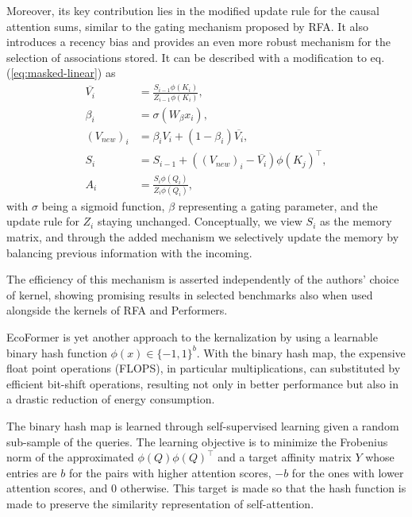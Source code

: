 Moreover, its key contribution lies in the modified update rule for the causal attention sums, similar to the gating mechanism proposed by RFA. It also introduces a recency bias and provides an even more robust mechanism for the selection of associations stored. It can be described with a modification to eq. (\ref{eq:masked-linear}) as
\begin{align*}
	\overline{V_i} &= \frac{S_{i-1} \phi(K_i)}{Z_{i-1} \phi(K_i)},  \\
	\beta_i &= \sigma(W_\beta x_i), \\
	(V_{new})_i &= \beta_i V_i + (1 - \beta_i) \overline{V_i}, \\
	S_i &= S_{i-1} + ((V_{new})_i - \overline{V_i})\phi(K_j)^\top, \\
	A_i &= \frac{S_i \phi(Q_i)}{Z_i \phi(Q_i)}, 
\end{align*}
with $\sigma$ being a sigmoid function, $\beta$ representing a gating parameter, and the update rule for $Z_i$ staying unchanged. Conceptually, we view $S_i$ as the memory matrix, and through the added mechanism we selectively update the memory by balancing previous information with the incoming. 

The efficiency of this mechanism is asserted independently of the authors' choice of kernel, showing promising results in selected benchmarks also when used alongside the kernels of RFA and Performers.


\vspace{1em}
EcoFormer\cite{liu2023ecoformer} is yet another approach to the kernalization by using a learnable binary hash function $\phi(x) \in \{-1, 1\}^b$. With the binary hash map, the expensive float point operations (FLOPS), in particular multiplications, can substituted by efficient bit-shift operations, resulting not only in better performance but also in a drastic reduction of energy consumption. 

The binary hash map is learned through self-supervised learning given a random sub-sample of the queries. The learning objective is to minimize the Frobenius norm of the approximated $\phi(Q)\phi(Q)^\top$ and a target affinity matrix $Y$ whose entries are $b$ for the pairs with higher attention scores, $-b$ for the ones with lower attention scores, and $0$ otherwise. This target is made so that the hash function is made to preserve the similarity representation of self-attention.

\vspace{1em}

